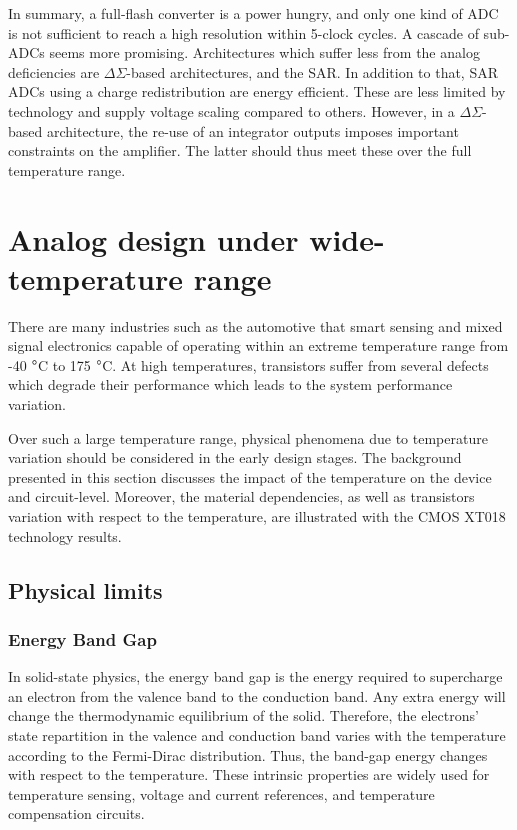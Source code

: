 In summary, a full-flash converter is a power hungry, and only one kind of ADC is not sufficient to reach a high resolution within 5-clock cycles. A cascade of sub-ADCs seems more promising. Architectures which suffer less from the analog deficiencies are $\Delta\Sigma$-based architectures, and the SAR\@. In addition to that, SAR ADCs using a charge redistribution are energy efficient. These are less limited by technology and supply voltage scaling compared to others.
However, in a $\Delta\Sigma$-based architecture, the re-use of an integrator outputs imposes important constraints on the amplifier. The latter should thus meet these over the full temperature range.

\clearpage
\section{Analog design under wide-temperature range}
\label{sec:temperature-analogue}

There are many industries such as the automotive that smart sensing and mixed signal electronics capable of operating within an extreme temperature range from -40 \(\degree \)C to 175 \(\degree \)C. At high temperatures, transistors suffer from several defects which degrade their performance which leads to the system performance variation.

Over such a large temperature range, physical phenomena due to temperature variation should be considered in the early design stages. The background presented in this section discusses the impact of the temperature on the device and circuit-level. Moreover, the material dependencies, as well as transistors variation with respect to the temperature, are illustrated with the CMOS XT018 technology results. %

\subsection{Physical limits}


\subsubsection{Energy Band Gap}        %
\label{sec:bandgap}
In solid-state physics, the energy band gap is the energy required to supercharge an electron from the valence band to the conduction band. Any extra energy will change the thermodynamic equilibrium of the solid. Therefore, the electrons' state repartition in the valence and conduction band varies with the temperature according to the Fermi-Dirac distribution. Thus, the band-gap energy changes with respect to the temperature. These intrinsic properties are widely used for temperature sensing, voltage and current references, and temperature compensation circuits.

